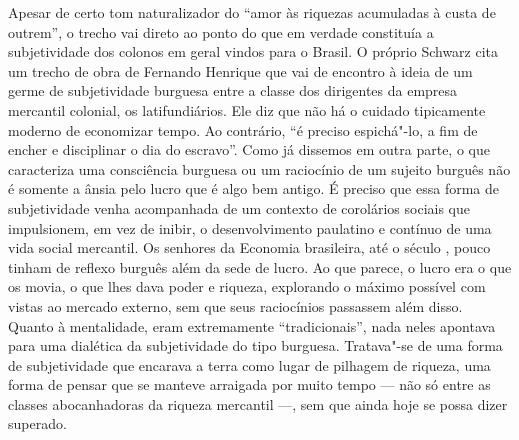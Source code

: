 Apesar de certo tom naturalizador do ``amor às riquezas acumuladas à
custa de outrem'', o trecho vai direto ao ponto do que em verdade
constituía a subjetividade dos colonos em geral vindos para o Brasil. O
próprio Schwarz cita um trecho de obra de Fernando Henrique que vai de
encontro à ideia de um germe de subjetividade burguesa entre a classe
dos dirigentes da empresa mercantil colonial, os latifundiários. Ele diz
que não há o cuidado tipicamente moderno de economizar tempo. Ao
contrário, ``é preciso espichá"-lo, a fim de encher e disciplinar o dia
do escravo''. Como já dissemos em outra parte, o que caracteriza uma
consciência burguesa ou um raciocínio de um sujeito burguês não é
somente a ânsia pelo lucro que é algo bem antigo. É preciso que essa
forma de subjetividade venha acompanhada de um contexto de corolários
sociais que impulsionem, em vez de inibir, o desenvolvimento paulatino
e contínuo de uma vida social mercantil. Os senhores da Economia
brasileira, até o século , pouco tinham de reflexo burguês além da
sede de lucro. Ao que parece, o lucro era o que os movia, o que lhes
dava poder e riqueza, explorando o máximo possível com vistas ao mercado
externo, sem que seus raciocínios passassem além disso. Quanto à
mentalidade, eram extremamente ``tradicionais'', nada neles apontava
para uma dialética da subjetividade do tipo burguesa. Tratava"-se de uma
forma de subjetividade que encarava a terra como lugar de pilhagem de
riqueza, uma forma de pensar que se manteve arraigada por muito tempo ---
não só entre as classes abocanhadoras da riqueza mercantil ---, sem que
ainda hoje se possa dizer superado.

